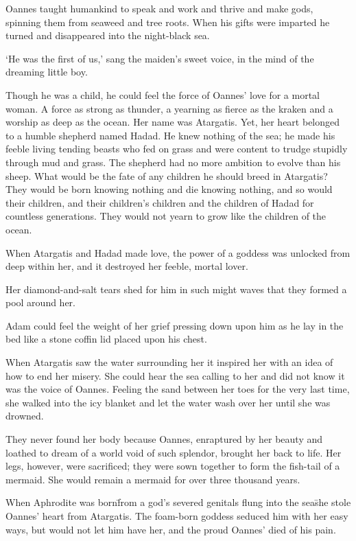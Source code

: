 Oannes taught humankind to speak and work and thrive and make gods,
spinning them from seaweed and tree roots. When his gifts were
imparted he turned and disappeared into the night-black sea.

`He was the first of us,' sang the maiden’s sweet voice, in the mind
of the dreaming little boy.

Though he was a child, he could feel the force of Oannes’ love for a
mortal woman. A force as strong as thunder, a yearning as fierce as
the kraken and a worship as deep as the ocean. Her name was
Atargatis. Yet, her heart belonged to a humble shepherd named
Hadad. He knew nothing of the sea; he made his feeble living tending
beasts who fed on grass and were content to trudge stupidly through
mud and grass. The shepherd had no more ambition to evolve than his
sheep. What would be the fate of any children he should breed in
Atargatis? They would be born knowing nothing and die knowing nothing,
and so would their children, and their children’s children and the
children of Hadad for countless generations. They would not yearn to
grow like the children of the ocean.

When Atargatis and Hadad made love, the power of a goddess was
unlocked from deep within her, and it destroyed her feeble, mortal
lover.

Her diamond-and-salt tears shed for him in such might waves that they
formed a pool around her.

Adam could feel the weight of her grief pressing down upon him as he
lay in the bed like a stone coffin lid placed upon his chest.

When Atargatis saw the water surrounding her it inspired her with an
idea of how to end her misery. She could hear the sea calling to her
and did not know it was the voice of Oannes. Feeling the sand between
her toes for the very last time, she walked into the icy blanket and
let the water wash over her until she was drowned.

They never found her body because Oannes, enraptured by her beauty and
loathed to dream of a world void of such splendor, brought her back to
life. Her legs, however, were sacrificed; they were sown together to
form the fish-tail of a mermaid. She would remain a mermaid for over
three thousand years.

When Aphrodite was born\=from a god’s severed genitals flung into the
sea\=she stole Oannes’ heart from Atargatis. The foam-born goddess
seduced him with her easy ways, but would not let him have her, and
the proud Oannes’ died of his pain.

